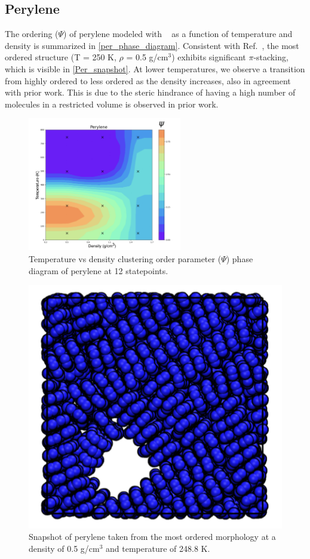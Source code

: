 \subsection{Perylene} %
The ordering ($\Psi$) of perylene modeled with \espff~ as a function of temperature and density is summarized in \autoref{per_phase_diagram}.
Consistent with Ref.~\citep{miller_optimization_2018}, the most ordered structure (T = 250 K, $\rho$ = 0.5 g/cm$^3$) exhibits significant $\pi$-stacking, which is visible in \autoref{Per_snapshot}. 
At lower temperatures, we observe a transition from highly ordered to less ordered as the density increases, also in agreement with prior work.
This is due to the steric hindrance of having a high number of molecules in a restricted volume is observed in prior work.
\begin{figure}[ht]
    \centering
    \includegraphics[width=0.6\textwidth]{src/figures/FF_figs/perPD.png} %
    \caption{Temperature vs density clustering order parameter ($\Psi$) phase diagram of perylene at 12 statepoints.}
    \label{per_phase_diagram}
\end{figure}
\begin{figure}[h!]
    \centering
    \includegraphics[width=0.35\linewidth]{src/figures/FF_figs/per_snapshot.png}
    \caption{Snapshot of perylene taken from the most ordered morphology at a density of 0.5 g/cm$^3$ and temperature of 248.8 K.}
    \label{Per_snapshot}
\end{figure}
